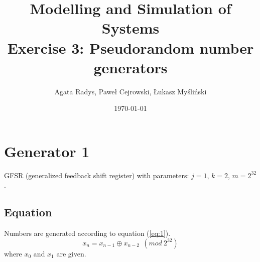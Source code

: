 \documentclass[a4paper,10pt]{article}
\title{Modelling and Simulation of Systems\\ \Large
Exercise 3: Pseudorandom number generators}
\author{Agata Radys, Paweł Cejrowski, Łukasz Myśliński}
\date{\today}
\begin{document}
\maketitle

\section{Generator 1}

GFSR (generalized feedback shift register) with parameters: $j=1$, $k=2$, $m=2^{32}$.
\subsection{Equation}
Numbers are generated according to equation (\ref{eq:1}).
\begin{equation}
\label{eq:1}
  x_n = x_{n-1} \oplus x_{n-2}\ \ (mod\ 2^{32})
\end{equation}
where ${x_0}$ and ${x_1}$ are given.
\end{document}

